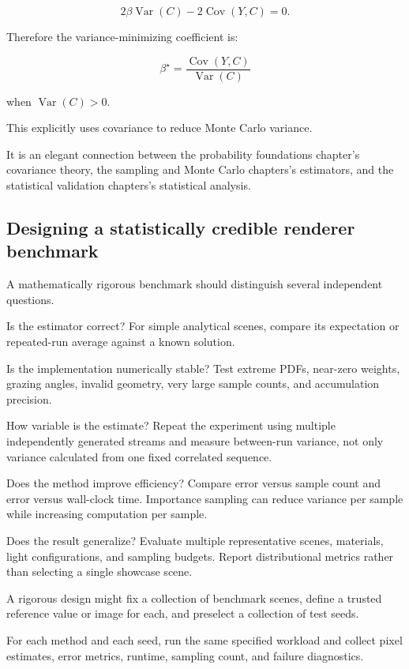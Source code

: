 \[
 2\beta\operatorname{Var}(C) -2\operatorname{Cov}(Y,C)=0.
\]

Therefore the variance-minimizing coefficient is:

\[
 \boxed{ \beta^\star= \frac{\operatorname{Cov}(Y,C)} {\operatorname{Var}(C)} }
\]

when \(\operatorname{Var}(C)>0\).

This explicitly uses covariance to reduce Monte Carlo variance.

It is an elegant connection between the probability foundations chapter's covariance theory, the sampling and Monte Carlo chapters's estimators, and the statistical validation chapters's statistical analysis.

\subsection{Designing a statistically credible renderer benchmark}\label{02-foundations-ii-ch031-designing-a-statistically-credible-renderer-benchmark}

A mathematically rigorous benchmark should distinguish several independent questions.

Is the estimator correct? For simple analytical scenes, compare its expectation or repeated-run average against a known solution.

Is the implementation numerically stable? Test extreme PDFs, near-zero weights, grazing angles, invalid geometry, very large sample counts, and accumulation precision.

How variable is the estimate? Repeat the experiment using multiple independently generated streams and measure between-run variance, not only variance calculated from one fixed correlated sequence.

Does the method improve efficiency? Compare error versus sample count and error versus wall-clock time. Importance sampling can reduce variance per sample while increasing computation per sample.

Does the result generalize? Evaluate multiple representative scenes, materials, light configurations, and sampling budgets. Report distributional metrics rather than selecting a single showcase scene.

A rigorous design might fix a collection of benchmark scenes, define a trusted reference value or image for each, and preselect a collection of test seeds.

For each method and each seed, run the same specified workload and collect pixel estimates, error metrics, runtime, sampling count, and failure diagnostics.

